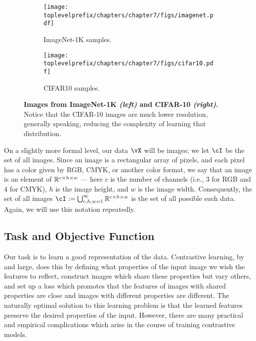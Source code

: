 \documentclass[\toplevelprefix/book-main.tex]{subfiles}
\begin{document}
\begin{figure}
    \centering
    
    \hfill 
    \begin{subfigure}{0.3\textwidth}
        \centering 
        \texttt{[image: \\toplevelprefix/chapters/chapter7/figs/imagenet.pdf]}
        \caption{\small ImageNet-1K samples.}
    \end{subfigure}
    \hfill 
    \begin{subfigure}{0.26\textwidth}
        \centering 
        \texttt{[image: \\toplevelprefix/chapters/chapter7/figs/cifar10.pdf]}
        \caption{\small CIFAR10 samples.}
    \end{subfigure}
    \hfill 
    \phantom{}

    \caption{\small\textbf{Images from ImageNet-1K \textit{(left)} and CIFAR-10 \textit{(right)}.} Notice that the CIFAR-10 images are much lower resolution, generally speaking, reducing the complexity of learning that distribution.}
    \label{fig:in1k_cifar10_examples}
\end{figure}

On a slightly more formal level, our data \(\vX\) will be images; we let \(\cI\) be the set of all images. Since an image is a rectangular array of pixels, and each pixel has a color given by RGB, CMYK, or another color format, we say that an image is an element of \(\mathbb{R}^{c \times h \times w}\) --- here \(c\) is the number of channels (i.e., \(3\) for RGB and \(4\) for CMYK), \(h\) is the image height, and \(w\) is the image width. Consequently, the set of all images \(\cI := \bigcup_{c, h, w = 1}^{\infty}\R^{c \times h \times w}\) is the set of all possible such data. Again, we will use this notation repeatedly.


\subsection{Task and Objective Function} \label{sub:contrastive_learning_objective}

Our task is to learn a good representation of the data. Contrastive learning, by and large, does this by defining what properties of the input image we wish the features to reflect, construct images which share these properties but vary others, and set up a loss which promotes that the features of images with shared properties are close and images with different properties are different. The naturally optimal solution to this learning problem is that the learned features preserve the desired properties of the input. However, there are many practical and empirical complications which arise in the course of training contrastive models.
\end{document}
